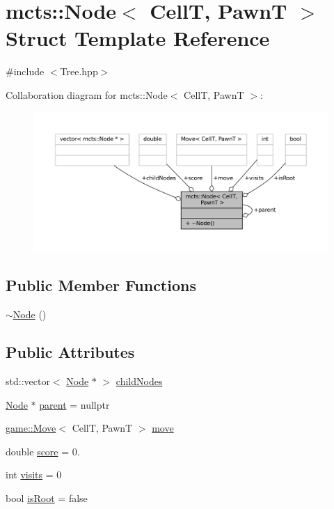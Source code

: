 \hypertarget{structmcts_1_1_node}{}\section{mcts\+:\+:Node$<$ CellT, PawnT $>$ Struct Template Reference}
\label{structmcts_1_1_node}


{\ttfamily \#include $<$Tree.\+hpp$>$}



Collaboration diagram for mcts\+:\+:Node$<$ CellT, PawnT $>$\+:
\nopagebreak
\begin{figure}[H]
\begin{center}
\leavevmode
\includegraphics[width=350pt]{structmcts_1_1_node__coll__graph}
\end{center}
\end{figure}
\subsection*{Public Member Functions}
\begin{DoxyCompactItemize}
\item 
\hyperlink{structmcts_1_1_node_a4507ae7e449448f5e67ac79782558070}{$\sim$\+Node} ()
\end{DoxyCompactItemize}
\subsection*{Public Attributes}
\begin{DoxyCompactItemize}
\item 
std\+::vector$<$ \hyperlink{structmcts_1_1_node}{Node} $\ast$ $>$ \hyperlink{structmcts_1_1_node_ae22ea6d47a865efe015fcc500bf4c217}{child\+Nodes}
\item 
\hyperlink{structmcts_1_1_node}{Node} $\ast$ \hyperlink{structmcts_1_1_node_a45967e40ee370988a6d14f9fa697d9fd}{parent} = nullptr
\item 
\hyperlink{structgame_1_1_move}{game\+::\+Move}$<$ CellT, PawnT $>$ \hyperlink{structmcts_1_1_node_a485be08ab0693648e76d350b7c330e04}{move}
\item 
double \hyperlink{structmcts_1_1_node_a9a63000d8d53ea603b846eb0163b9660}{score} = 0.
\item 
int \hyperlink{structmcts_1_1_node_aca6c2aab11093323fb67357f25a31a3f}{visits} = 0
\item 
bool \hyperlink{structmcts_1_1_node_a0617583b89269c8df9bacf1f573c5657}{is\+Root} = false
\end{DoxyCompactItemize}


